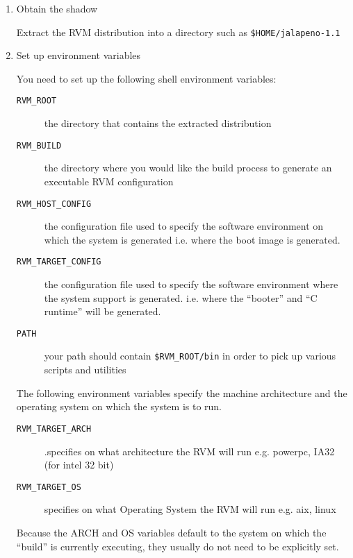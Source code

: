 \begin{enumerate}
\item Obtain the shadow

Extract the RVM distribution into
a directory such as {\tt \$HOME/jalapeno-1.1}

\item Set up environment variables

You need to set up the following shell environment variables:

\begin{description}
\item [{\tt RVM\_ROOT}] the directory that contains the extracted
distribution 
\item [{\tt RVM\_BUILD}] the directory where you would like the build
process to generate an executable RVM configuration

\item [{\tt RVM\_HOST\_CONFIG}] the configuration file used to specify
the software environment on which the system is generated i.e. where the
boot image is generated.

\item [{\tt RVM\_TARGET\_CONFIG}] the configuration file used to specify
the software environment where the system support is generated. i.e. where
the ``booter'' and ``C runtime'' will be generated.

\item[{\tt PATH}] your path should contain {\tt \$RVM\_ROOT/bin} in
order to pick up various scripts and utilities
\end{description}

The following environment variables specify the machine architecture and
the operating system on which the system is to run.
\begin{description}

\item [{\tt RVM\_TARGET\_ARCH}].specifies on what architecture
the RVM will run e.g.  powerpc, IA32 (for intel 32 bit)

\item [{\tt RVM\_TARGET\_OS}] specifies on what Operating System
the RVM will run e.g. aix, linux

\end{description}

Because the ARCH and OS  variables default to the system on which the ``build'' is
currently executing, they usually do not need to be 
explicitly set.



\end{enumerate}
